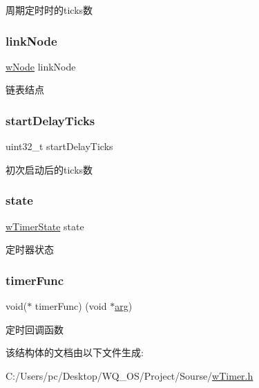周期定时时的ticks数 \mbox{\label{struct__w_timer_aace0256afebaf717de11433d186f53b2}} 
\subsubsection{\texorpdfstring{link\+Node}{linkNode}}
{\footnotesize\ttfamily \mbox{\hyperlink{w_lib_8h_a98363f2fc9ff1bef5993786140d900f2}{w\+Node}} link\+Node}

链表结点 \mbox{\label{struct__w_timer_acecf013811265c398517a464e7e6f7b2}} 
\subsubsection{\texorpdfstring{start\+Delay\+Ticks}{startDelayTicks}}
{\footnotesize\ttfamily uint32\+\_\+t start\+Delay\+Ticks}

初次启动后的ticks数 \mbox{\label{struct__w_timer_ac82a56d0e6704cdcfdad6e80803b1674}} 
\subsubsection{\texorpdfstring{state}{state}}
{\footnotesize\ttfamily \mbox{\hyperlink{w_timer_8h_afd5ce485f9f6080eb16b9b0d11c09dcd}{w\+Timer\+State}} state}

定时器状态 \mbox{\label{struct__w_timer_a5b39f4308b8e715d9278cbf70f7297c7}} 
\subsubsection{\texorpdfstring{timer\+Func}{timerFunc}}
{\footnotesize\ttfamily void($\ast$ timer\+Func) (void $\ast$\mbox{\hyperlink{struct__w_timer_a9ce2ec4812a92cb6ab39f6e81e9173a9}{arg}})}

定时回调函数 

该结构体的文档由以下文件生成\+:\begin{DoxyCompactItemize}
\item 
C\+:/\+Users/pc/\+Desktop/\+W\+Q\+\_\+\+O\+S/\+Project/\+Sourse/\mbox{\hyperlink{w_timer_8h}{w\+Timer.\+h}}\end{DoxyCompactItemize}
